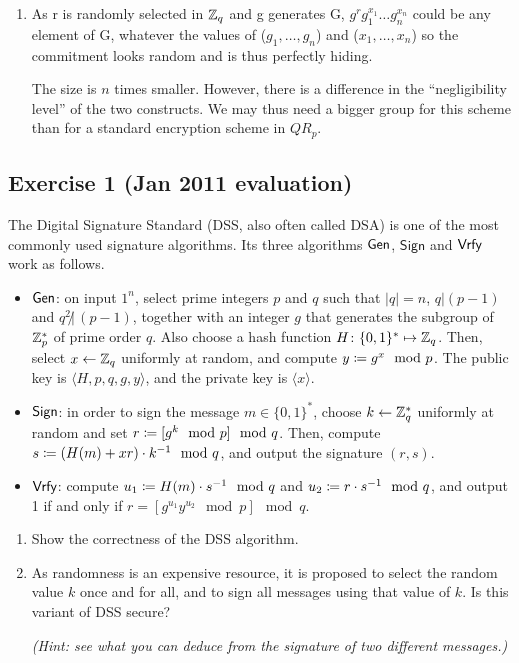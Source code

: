 \begin{solution}
\begin{enumerate}
		\item
		As r is randomly selected in $\mathbb{Z}_q$ and g generates G, $g^rg_1^{x_1} \dots g_n^{x_n}$ could be any element of G, whatever the values of ($g_1,\dots,g_n$) and ($x_1,\dots,x_n$) so the commitment looks random and is thus perfectly hiding.

		The size is $n$ times smaller.
		However, there is a difference in the ``negligibility level'' of the two constructs.
		We may thus need a bigger group for this scheme than for a standard encryption scheme in $QR_p$.
	\end{enumerate}
\end{solution}



\subsection{Exercise 1 (Jan 2011 evaluation)}

The Digital Signature Standard (DSS, also often called DSA) is one of
the most commonly used signature algorithms. Its three algorithms
$\operatorname{\mathsf{Gen}}$, $\mathsf{Sign}$ and $\operatorname{\mathsf{Vrfy}}$ work as follows.
\begin{itemize}
	\item $\operatorname{\mathsf{Gen}}$: on input $1^n$, select prime integers $p$ and $q$ such
	that $|q|=n$, $q | (p-1)$ and $q^2 \not | \, (p-1)$, together with an
	integer $g$ that generates the subgroup of $\mathbb{Z}_p^*$ of prime
	order $q$. Also choose a hash function $H\colon \{0, 1\}^* \mapsto
	\mathbb{Z}_q$. Then, select $x \leftarrow \mathbb{Z}_q$ uniformly at
	random, and compute $y \coloneqq g^x \mod p$. The public key is $\langle H,
	p, q, g, y\rangle$, and the private key is $\langle x\rangle$.
	\item $\operatorname{\mathsf{Sign}}$: in order to sign the message $m \in \{0,1\}^*$, choose
	$k \leftarrow \mathbb{Z}_q^*$ uniformly at random and set $r \coloneqq [g^k
	\mod p] \mod q$. Then, compute $s \coloneqq (H(m) + xr) \cdot k^{-1} \mod
	q$, and output the signature $(r,s)$.
	\item $\operatorname{\mathsf{Vrfy}}$: compute $u_1 \coloneqq H(m)\cdot s^{-1} \mod q$ and $u_2 \coloneqq r
	\cdot s^{-1} \mod q$, and output 1 if and only if $r = [g^{u_1} y^{u_2} \mod p] \mod q$.
\end{itemize}

\begin{enumerate}
	\item Show the correctness of the DSS algorithm.
	\item
	As randomness is an expensive resource, it is proposed to select
	the random value $k$ once and for all, and to sign all messages
	using that value of $k$. Is this variant of DSS secure?

	\emph{(Hint: see what you can deduce from the signature of two
		different messages.)}
\end{enumerate}


